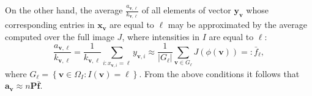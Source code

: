 On the other hand, the average $\frac{a_{\mathbf{v},\ell}}{k_{\mathbf{v},\ell}}$ of all elements of vector $\mathbf{y}_{\mathbf{v}}$ whose corresponding entries in $\mathbf{x}_{\mathbf{v}}$ are equal to $\ell$ may be approximated by the average computed over the full image $J$, where intensities in $I$ are equal to $\ell$:
\begin{equation}\label{eq:average_of_isosets}
    \frac{a_{\mathbf{v},\ell}}{k_{\mathbf{v},\ell}} =  \frac{1}{k_{\mathbf{v},\ell}}\sum_{i:x_{\mathbf{v},i}=\ell} y_{\mathbf{v},i} \approx \frac{1}{|G_{\ell}|}\sum_{\mathbf{v}\in G_{\ell}} J(\phi(\mathbf{v}))
    =:\bar{f}_{\ell},
\end{equation}
where $G_{\ell} = \left\lbrace \mathbf{v}\in \Omega_{I}: I(\mathbf{v}) = \ell\right\rbrace$. From the above conditions it follows that $\mathbf{a}_{\mathbf{v}} \approx n \mathbf{P} \mathbf{\bar{f}}$.\\

